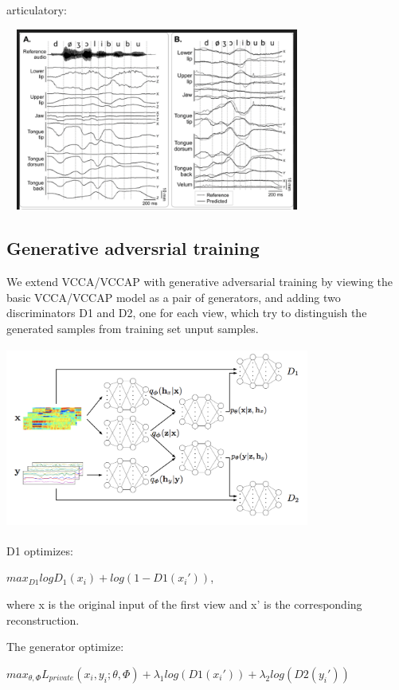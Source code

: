 \documentclass[a4paper]{article}
\begin{document}
articulatory:
\begin{center}
\includegraphics[width=10cm, height=6cm]{art.png}
\end{center}

\subsection{Generative adversrial training}

We extend VCCA/VCCAP with generative adversarial training by viewing the basic VCCA/VCCAP model as a pair of generators, and adding two discriminators D1 and D2, one for each view, which try to distinguish the generated samples from training set unput samples.

\begin{center}
\includegraphics[width=10cm, height=6cm]{vccapg.png}
\end{center}

D1 optimizes:

$max_{D1} logD_1(x_i)+log(1-D1(x_i'))$, 

where x is the original input of the first view and x' is the corresponding reconstruction.

The generator optimize:

$max_{\theta,\Phi} L_{private}(x_i,y_i;\theta,\Phi) + \lambda_1log(D1(x_i'))+\lambda_2log(D2(y_i'))$
\end{document}
